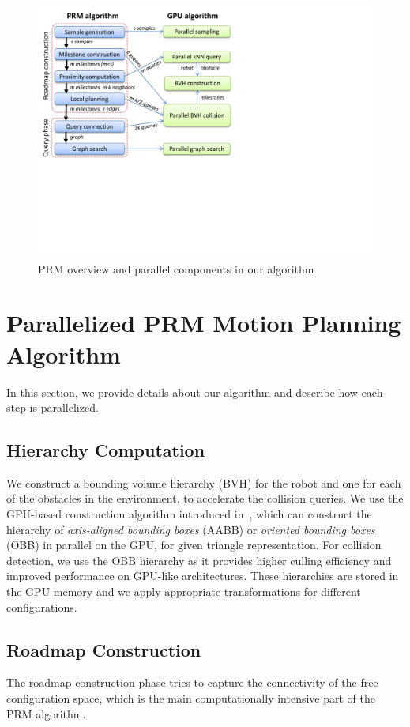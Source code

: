\begin{figure}[htb]
  \centering
  \includegraphics[width=0.9\linewidth]{figs/4/algorithm_overview.pdf}
  \caption[An overview of serial PRM and the GPU-based planner]{PRM overview and parallel components in our algorithm}
  \label{fig:4:GPU}
\end{figure}


\section{Parallelized PRM Motion Planning Algorithm}
\label{sec:4:algorithm}
In this section, we provide details about our algorithm and describe how each step is parallelized.

\subsection{Hierarchy Computation}
We construct a bounding volume hierarchy (BVH) for the robot and one for each of the obstacles in the environment, to accelerate the collision queries. We use the GPU-based construction algorithm introduced in~\cite{LauterbachGSLM09}, which can construct the hierarchy of \emph{axis-aligned bounding boxes} (AABB) or \emph{oriented bounding boxes} (OBB) in parallel on the GPU, for given triangle representation. For collision detection, we use the OBB hierarchy as it provides higher culling
efficiency and improved performance on GPU-like architectures. These hierarchies are stored in the GPU memory and we apply appropriate transformations for different configurations.

\subsection{Roadmap Construction}
The roadmap construction phase tries to capture the connectivity of the free configuration space, which is the main computationally intensive part of the PRM algorithm.

